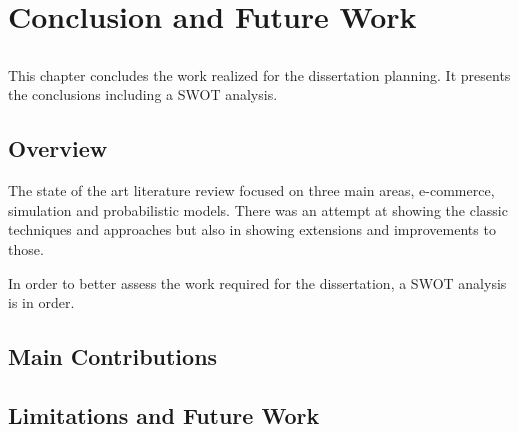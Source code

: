 \chapter{Conclusion and Future Work} \label{chap:conclusion}

\section*{}

This chapter concludes the work realized for the dissertation planning. It 
presents the conclusions including a SWOT analysis.

\section{Overview}

The state of the art literature review focused on three main areas, e-commerce, 
simulation and probabilistic models. There was an attempt at showing the 
classic techniques and approaches but also in showing extensions and 
improvements to those.

In order to better assess the work required for the dissertation, a SWOT 
analysis is in order.

% 
% 
% 
% 


\section{Main Contributions}

\section{Limitations and Future Work}
